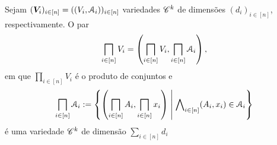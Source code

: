 \begin{exercise}
Sejam $(\bm V_i)_{i \in [n]} = ((V_i,\mathcal{A}_i))_{i \in [n]}$ variedades $\mathscr{C}^k$ de dimensões $(d_i)_{i \in [n]}$, respectivamente. O par
	\begin{equation*}
	\prod_{i \in [n]} V_i = \left( \prod_{i \in [n]} V_i, \prod_{i \in [n]} \atlas_i \right),
	\end{equation*}
em que $\prod_{i \in [n]} V_i$ é o produto de conjuntos e
	\begin{equation*}
	\prod_{i \in [n]} \atlas_i := \set{ \left(\prod_{i \in [n]} A_i, \prod_{i \in [n]} \x_i \right)}{\forall_{i \in [n]} (A_i,\x_i) \in \atlas_i}
	\end{equation*}
é uma variedade $\mathscr{C}^k$ de dimensão $\sum_{i \in [n]} d_i$
\end{exercise}

